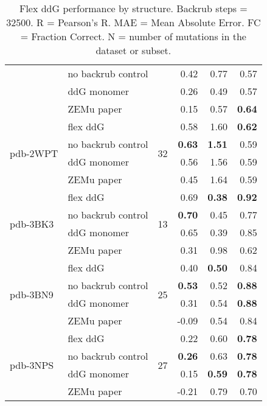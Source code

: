 \begin{table}
\begin{tabular}{llrrrr}
 & no backrub control & & 0.42 & 0.77 & 0.57  \\
 & ddG monomer & & 0.26 & 0.49 & 0.57  \\
 & ZEMu paper & & 0.15 & 0.57 & \textbf{0.64}  \\
\hline
 \multirow{ 4}{*}{pdb-2WPT} & flex ddG & \multirow{ 4}{*}{32} & 0.58 & 1.60 & \textbf{0.62}  \\
 & no backrub control & & \textbf{0.63} & \textbf{1.51} & 0.59  \\
 & ddG monomer & & 0.56 & 1.56 & 0.59  \\
 & ZEMu paper & & 0.45 & 1.64 & 0.59  \\
\hline
 \multirow{ 4}{*}{pdb-3BK3} & flex ddG & \multirow{ 4}{*}{13} & 0.69 & \textbf{0.38} & \textbf{0.92}  \\
 & no backrub control & & \textbf{0.70} & 0.45 & 0.77  \\
 & ddG monomer & & 0.65 & 0.39 & 0.85  \\
 & ZEMu paper & & 0.31 & 0.98 & 0.62  \\
\hline
 \multirow{ 4}{*}{pdb-3BN9} & flex ddG & \multirow{ 4}{*}{25} & 0.40 & \textbf{0.50} & 0.84  \\
 & no backrub control & & \textbf{0.53} & 0.52 & \textbf{0.88}  \\
 & ddG monomer & & 0.31 & 0.54 & \textbf{0.88}  \\
 & ZEMu paper & & -0.09 & 0.54 & 0.84  \\
\hline
 \multirow{ 4}{*}{pdb-3NPS} & flex ddG & \multirow{ 4}{*}{27} & 0.22 & 0.60 & \textbf{0.78}  \\
 & no backrub control & & \textbf{0.26} & 0.63 & \textbf{0.78}  \\
 & ddG monomer & & 0.15 & \textbf{0.59} & \textbf{0.78}  \\
 & ZEMu paper & & -0.21 & 0.79 & 0.70  \\
\bottomrule
\end{tabular}
  \caption[Flex ddG performance by structure]{
    Flex ddG performance by structure. Backrub steps = 32500. R = Pearson's R. MAE = Mean Absolute Error. FC = Fraction Correct. N = number of mutations in the dataset or subset.
  } \label{tab:table-by-structure}
\end{table}

